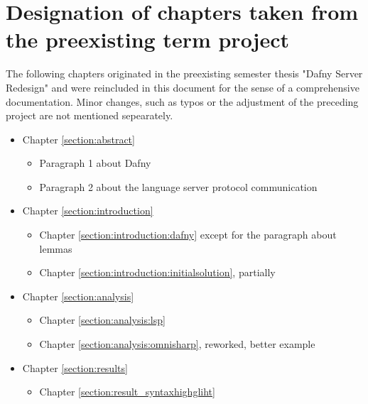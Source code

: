 \section{Designation of chapters taken from the preexisting term project}
The following chapters originated in the preexisting semester thesis "Dafny Server Redesign"\cite{sa} and were reincluded in this document for the sense of a comprehensive documentation. Minor changes, such as typos or the adjustment of the preceding project are not mentioned sepearately.
\begin{itemize}
    \item Chapter \ref{section:abstract}
        \begin{itemize}
            \item Paragraph 1 about Dafny
            \item Paragraph 2 about the language server protocol communication
        \end{itemize}
    \item Chapter \ref{section:introduction}
        \begin{itemize}
            \item Chapter \ref{section:introduction:dafny} except for the paragraph about lemmas
            \item Chapter \ref{section:introduction:initialsolution}, partially
        \end{itemize}

    \item Chapter \ref{section:analysis}
        \begin{itemize}
            \item Chapter \ref{section:analysis:lsp}
            \item Chapter \ref{section:analysis:omnisharp}, reworked, better example
        \end{itemize}
    
    \item Chapter \ref{section:results}
        \begin{itemize}
            \item Chapter \ref{section:result_syntaxhighgliht}
        \end{itemize}

        

\end{itemize}
